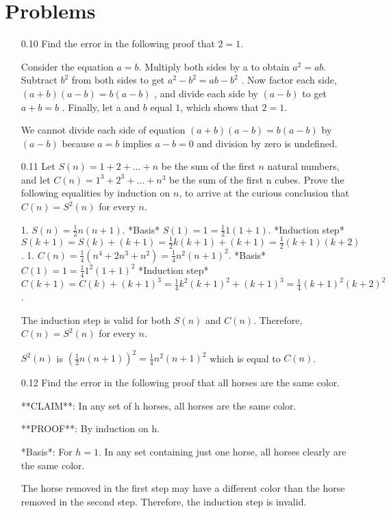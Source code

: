 \documentclass[12pt, a4paper]{article}
\begin{document}
\section{Problems}

\begin{enumerate}

    \item[0.10]
Find the error in the following proof that $2 = 1$. 

Consider the equation $a = b$. Multiply both sides by a to obtain 
$a^2 = ab$. 
Subtract 
$b^2$ 
from both sides to get 
$a^2 - b^2 = ab - b^2$
. Now factor each side, 
$(a + b)(a - b) = b(a - b)$
, and divide each side by 
$(a - b)$ 
to get 
$a + b = b$
. Finally, let a and $b$ equal $1$, which shows that $2 = 1$.


We cannot divide each side of equation $(a + b)(a - b) = b(a - b)$ by $(a - b)$ because $a = b$ implies $a - b = 0$ and division by zero is undefined.

    \item[0.11]
Let $S(n) = 1 + 2 + \ldots + n$ be the sum of the first $n$ natural numbers, and let $C(n) = 1^3 + 2^3 + \ldots + n^3$ be the sum of the first n cubes. Prove the following equalities by induction on $n$, to arrive at the curious conclusion that $C(n) = S^2(n)$ for every $n$.

1. $S(n) = \frac{1}{2} n(n+1)$.
*Basis*
$ S(1) = 1 = \frac{1}{2} 1(1+1)$.
*Induction step*
$ S(k+1) = S(k) + (k+1) = \frac{1}{2} k(k+1) + (k+1) = \frac{1}{2} (k+1)(k+2)$.
1. $C(n) = \frac{1}{4}(n^4 + 2n^3 + n^2) = \frac{1}{4} n^2(n+1)^2$.
*Basis*
$ C(1) = 1 = \frac{1}{4} 1^2(1+1)^2$
*Induction step*
$ C(k+1) = C(k) + (k+1)^3 = \frac{1}{4} k^2(k+1)^2 + (k+1)^3 = \frac{1}{4} (k+1)^2(k+2)^2$.

The induction step is valid for both $S(n)$ and $C(n)$. Therefore, $C(n) = S^2(n)$ for every $n$.

$S^2(n)$ is $(\frac{1}{2} n(n+1))^2 = \frac{1}{4} n^2(n+1)^2$ which is equal to $C(n)$.

    \item[0.12]
Find the error in the following proof that all horses are the same color.

**CLAIM**: In any set of h horses, all horses are the same color.

**PROOF**: By induction on h.

*Basis*: For $h = 1$. In any set containing just one horse, all horses clearly are the same color.

The horse removed in the first step may have a different color than the horse removed in the second step. Therefore, the induction step is invalid.


\end{enumerate}
\end{document}
